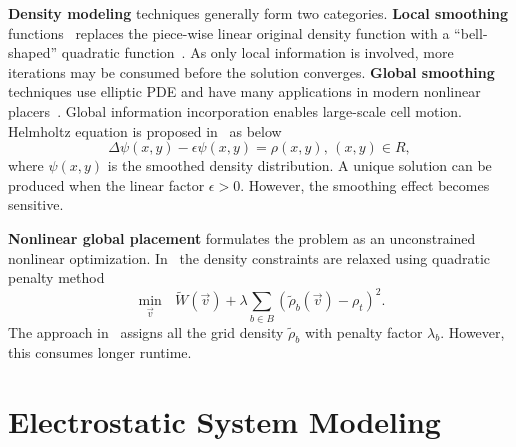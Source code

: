 \documentclass[conference,10pt]{IEEEtran}
\begin{document}
{\bf Density modeling} techniques
generally form two categories.
{\bf Local smoothing} 
functions~\cite{naylor} 
replaces the piece-wise linear original 
density function
with a ``bell-shaped'' quadratic function~\cite{ntupl3,aplace2}.
As only local information is involved,
more iterations may be consumed before the solution 
converges. 
{\bf Global smoothing} techniques 
use elliptic PDE and have many applications 
in modern nonlinear placers~\cite{mpl6}. 
Global information incorporation enables large-scale cell motion. 
Helmholtz equation is proposed in~\cite{mpl6} as below
\begin{equation}
\label{eq:helm}
\Delta\psi(x,y)-\epsilon\psi(x,y)=\rho(x,y)\text{, } (x,y)\in R, 
\end{equation}
where $\psi(x,y)$ is the smoothed density distribution. 
A unique solution can be produced when the linear factor $\epsilon>0$.
However, the smoothing effect becomes sensitive.

{\bf Nonlinear global placement} formulates the 
problem as an unconstrained nonlinear optimization.
In~\cite{ntupl3,aplace2} 
the density constraints are relaxed 
using quadratic penalty method
\begin{equation}
\label{eq:obj1}
\min_{\vec{v}}\text{    }\widetilde{W}(\vec{v})+\lambda\sum_{b\in B}\left(\widetilde{\rho}_b(\vec{v})-\rho_t\right)^2.
\end{equation}
The approach in~\cite{mpl6}
assigns all the grid density $\widetilde{\rho}_b$ 
with penalty factor $\lambda_b$.
However, this consumes longer runtime.



\section{Electrostatic System Modeling}
\label{sec:new}
\end{document}
